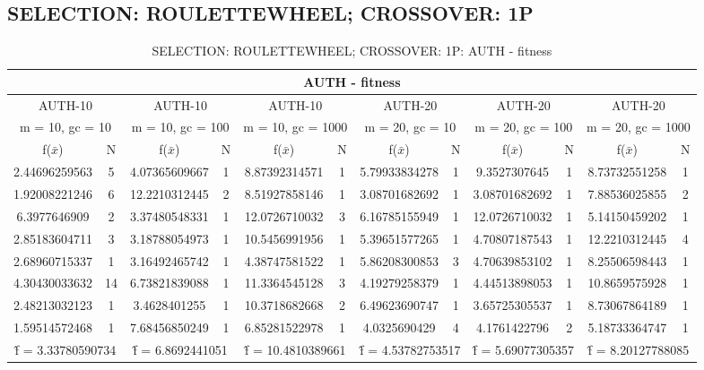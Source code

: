 \subsection{SELECTION: ROULETTEWHEEL; CROSSOVER: 1P}
\begin{table}[H]
	\centering
	\caption{SELECTION: ROULETTEWHEEL; CROSSOVER: 1P: AUTH - fitness}
	\begin{adjustbox}{width=1\textwidth}
		\begin{tabular}{ |c|c||c|c||c|c||c|c||c|c||c|c| }
			\hline
			\multicolumn{12}{|c|}{AUTH - fitness} \\
			\hline
			\multicolumn{2}{|c||}{AUTH-10} & \multicolumn{2}{c||}{AUTH-10} & \multicolumn{2}{c||}{AUTH-10} & \multicolumn{2}{c||}{AUTH-20} & \multicolumn{2}{c||}{AUTH-20} & \multicolumn{2}{c|}{AUTH-20}\\
			\hline
			\multicolumn{2}{|c||}{m = 10, gc = 10} & \multicolumn{2}{c||}{m = 10, gc = 100} & \multicolumn{2}{c||}{m = 10, gc = 1000} & \multicolumn{2}{c||}{m = 20, gc = 10} & \multicolumn{2}{c||}{m = 20, gc = 100} & \multicolumn{2}{c|}{m = 20, gc = 1000}\\
			\hline
			f($\bar{x}$) & N & f($\bar{x}$) & N & f($\bar{x}$) & N & f($\bar{x}$) & N & f($\bar{x}$) & N & f($\bar{x}$) & N\\
			\hline
			\hline
			2.44696259563 & 5 & 4.07365609667 & 1 & 8.87392314571 & 1 & 5.79933834278 & 1 & 9.3527307645 & 1 & 8.73732551258 & 1\\
			1.92008221246 & 6 & 12.2210312445 & 2 & 8.51927858146 & 1 & 3.08701682692 & 1 & 3.08701682692 & 1 & 7.88536025855 & 2\\
			6.3977646909 & 2 & 3.37480548331 & 1 & 12.0726710032 & 3 & 6.16785155949 & 1 & 12.0726710032 & 1 & 5.14150459202 & 1\\
			2.85183604711 & 3 & 3.18788054973 & 1 & 10.5456991956 & 1 & 5.39651577265 & 1 & 4.70807187543 & 1 & 12.2210312445 & 4\\
			2.68960715337 & 1 & 3.16492465742 & 1 & 4.38747581522 & 1 & 5.86208300853 & 3 & 4.70639853102 & 1 & 8.25506598443 & 1\\
			4.30430033632 & 14 & 6.73821839088 & 1 & 11.3364545128 & 3 & 4.19279258379 & 1 & 4.44513898053 & 1 & 10.8659575928 & 1\\
			2.48213032123 & 1 & 3.4628401255 & 1 & 10.3718682668 & 2 & 6.49623690747 & 1 & 3.65725305537 & 1 & 8.73067864189 & 1\\
			1.59514572468 & 1 & 7.68456850249 & 1 & 6.85281522978 & 1 & 4.0325690429 & 4 & 4.1761422796 & 2 & 5.18733364747 & 1\\
			\hline
			\multicolumn{2}{|c||}{\^{f} = 3.33780590734} & \multicolumn{2}{c||}{\^{f} = 6.8692441051} & \multicolumn{2}{c||}{\^{f} = 10.4810389661} & \multicolumn{2}{c||}{\^{f} = 4.53782753517} & \multicolumn{2}{c||}{\^{f} = 5.69077305357} & \multicolumn{2}{c|}{\^{f} = 8.20127788085}\\
			\hline
		\end{tabular}
	\end{adjustbox}
\end{table}
